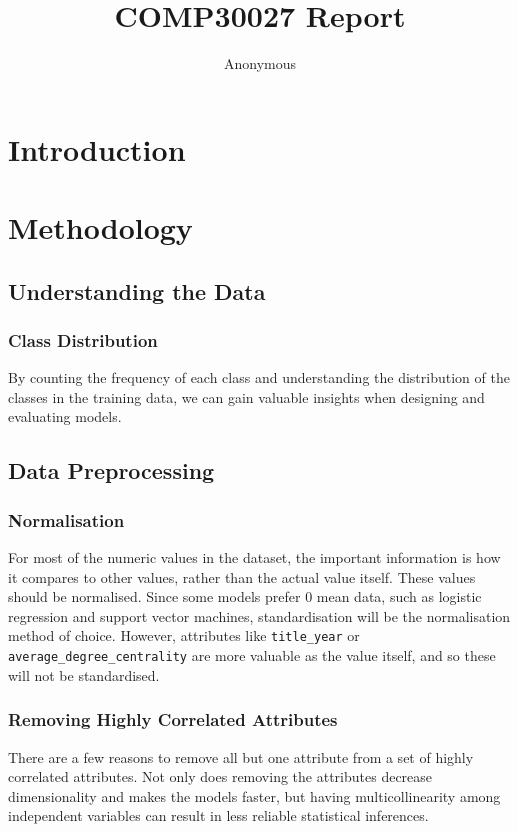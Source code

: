 \documentclass[11pt]{article}
\title{COMP30027 Report}
\author
{Anonymous}
\begin{document}
\maketitle



\section{Introduction}


\section{Methodology}

\subsection{Understanding the Data}
\subsubsection{Class Distribution} 
By counting the frequency of each class and understanding the distribution of the classes in the training data, we can gain valuable insights when designing and evaluating models.

\subsection{Data Preprocessing}

\subsubsection{Normalisation}
For most of the numeric values in the dataset, the important information is how it compares to other values, rather than the actual value itself. These values should be normalised. Since some models prefer 0 mean data, such as logistic regression and support vector machines, standardisation will be the normalisation method of choice. However, attributes like \texttt{title\_year} or \texttt{average\_degree\_centrality} are more valuable as the value itself, and so these will not be standardised.

\subsubsection{Removing Highly Correlated Attributes}
There are a few reasons to remove all but one attribute from a set of highly correlated attributes. Not only does removing the attributes decrease dimensionality and makes the models faster, but having multicollinearity among independent variables can result in less reliable statistical inferences.
\end{document}
